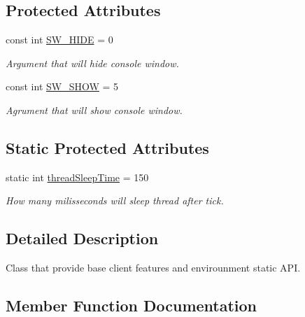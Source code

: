 \subsection*{Protected Attributes}
\begin{DoxyCompactItemize}
\item 
const int \mbox{\hyperlink{class_uniform_client_1_1_base_client_a6060f2eb1d44ec518f2dfc99c8b4f7aa}{S\+W\+\_\+\+H\+I\+DE}} = 0
\begin{DoxyCompactList}\small\item\em Argument that will hide console window. \end{DoxyCompactList}\item 
const int \mbox{\hyperlink{class_uniform_client_1_1_base_client_a7545b9c72eef6cb7594a7001d3f558e4}{S\+W\+\_\+\+S\+H\+OW}} = 5
\begin{DoxyCompactList}\small\item\em Agrument that will show console window. \end{DoxyCompactList}\end{DoxyCompactItemize}
\subsection*{Static Protected Attributes}
\begin{DoxyCompactItemize}
\item 
static int \mbox{\hyperlink{class_uniform_client_1_1_base_client_a2c4762c1be5eac42b8b5d189530d0952}{thread\+Sleep\+Time}} = 150
\begin{DoxyCompactList}\small\item\em How many milisseconds will sleep thread after tick. \end{DoxyCompactList}\end{DoxyCompactItemize}


\subsection{Detailed Description}
Class that provide base client features and envirounment static A\+PI. 



\subsection{Member Function Documentation}
\mbox{\label{class_uniform_client_1_1_base_client_a7ec48981cf3e7ec10d2cb7dff81f912a}} 
